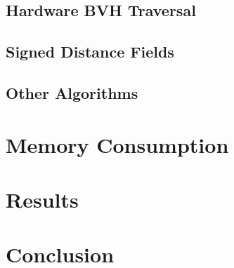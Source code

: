 \documentclass[12pt]{article}
\begin{document}
\subsection{Hardware BVH Traversal}
\subsection{Signed Distance Fields}
\subsection{Other Algorithms}

\section{Memory Consumption}

\section{Results}

\section{Conclusion}
\end{document}
